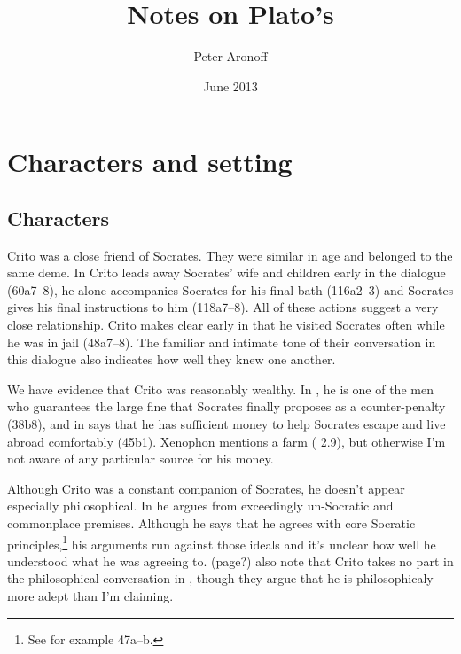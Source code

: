 \documentclass[11pt]{article}
\begin{document}
\begin{titlepage}
\title{Notes on Plato's }
\author{Peter Aronoff}
\date{June 2013}
\maketitle
\end{titlepage}

\section{Characters and setting}

\subsection{Characters}

Crito was a close friend of Socrates.  They were similar in age and belonged to the same deme.  In  Crito leads away Socrates' wife and children early in the dialogue (60a7--8), he alone accompanies Socrates for his final bath (116a2--3) and Socrates gives his final instructions to him (118a7--8).  All of these actions suggest a very close relationship.  Crito makes clear early in  that he visited Socrates often while he was in jail (48a7--8).  The familiar and intimate tone of their conversation in this dialogue also indicates how well they knew one another.

We have evidence that Crito was reasonably wealthy.  In , he is one of the men who guarantees the large fine that Socrates finally proposes as a counter-penalty (38b8), and in  says that he has sufficient money to help Socrates escape and live abroad comfortably (45b1).  Xenophon mentions a farm ( 2.9), but otherwise I'm not aware of any particular source for his money.

Although Crito was a constant companion of Socrates, he doesn't appear especially philosophical.  In  he argues from exceedingly un-Socratic and commonplace premises.  Although he says that he agrees with core Socratic principles,\footnote{See for example 47a--b.} his arguments run against those ideals and it's unclear how well he understood what he was agreeing to.  \citet{brickhouse2004} (page?) also note that Crito takes no part in the philosophical conversation in , though they argue that he is philosophicaly more adept than I'm claiming.
\end{document}
